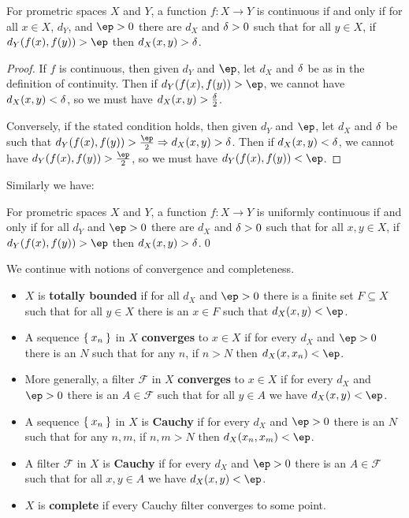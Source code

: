 \documentclass{article}
\def\F{\mathcal{F}}
\begin{document}
\begin{lem}\label{thm:cocontinuous}
  For prometric spaces $X$ and $Y$, a function $f:X\to Y$ is continuous if and only if for all $x\in X$, $d_Y$, and $\ep>0$ there are $d_X$ and $\delta>0$ such that for all $y\in X$, if $d_Y(f(x),f(y))>\ep$ then $d_X(x,y)>\delta$.
\end{lem}
\begin{proof}
  If $f$ is continuous, then given $d_Y$ and $\ep$, let $d_X$ and $\delta$ be as in the definition of continuity.
  Then if $d_Y(f(x),f(y)) > \ep$, we cannot have $d_X(x,y) < \delta$, so we must have $d_X(x,y) > \frac{\delta}{2}$.

  Conversely, if the stated condition holds, then given $d_Y$ and $\ep$, let $d_X$ and $\delta$ be such that $d_Y(f(x),f(y))>\frac{\ep}{2} \Rightarrow d_X(x,y)>\de$.
  Then if $d_X(x,y)<\delta$, we cannot have $d_Y(f(x),f(y))>\frac{\ep}{2}$, so we must have $d_Y(f(x),f(y))<\ep$.
\end{proof}

Similarly we have:

\begin{lem}\label{thm:unif-cocontinuous}
  For prometric spaces $X$ and $Y$, a function $f:X\to Y$ is uniformly continuous if and only if for all $d_Y$ and $\ep>0$ there are $d_X$ and $\delta>0$ such that for all $x,y\in X$, if $d_Y(f(x),f(y))>\ep$ then $d_X(x,y)>\delta$.\qed
\end{lem}

We continue with notions of convergence and completeness.

\begin{itemize}
\item $X$ is \textbf{totally bounded} if for all $d_X$ and $\ep>0$ there is a finite set $F\subseteq X$ such that for all $y\in X$ there is an $x\in F$ such that $d_X(x,y)<\ep$.
\item A sequence $\Set{x_n}$ in $X$ \textbf{converges} to $x\in X$ if for every $d_X$ and $\ep>0$ there is an $N$ such that for any $n$, if $n>N$ then $d_X(x,x_n)<\ep$.
\item More generally, a filter $\F$ in $X$ \textbf{converges} to $x\in X$ if for every $d_X$ and $\ep>0$ there is an $A\in\F$ such that for all $y\in A$ we have $d_X(x,y)<\ep$.
\item A sequence $\Set{x_n}$ in $X$ is \textbf{Cauchy} if for every $d_X$ and $\ep>0$ there is an $N$ such that for any $n,m$, if $n,m>N$ then $d_X(x_n,x_m)<\ep$.
\item A filter $\F$ in $X$ is \textbf{Cauchy} if for every $d_X$ and $\ep>0$ there is an $A\in\F$ such that for all $x,y\in A$ we have $d_X(x,y)<\ep$.
\item $X$ is \textbf{complete} if every Cauchy filter converges to some point.
\end{itemize}
\end{document}

